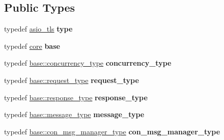 \subsection*{Public Types}
\begin{DoxyCompactItemize}
\item 
\mbox{\label{structwebsocketpp_1_1config_1_1asio__tls_a92b38c443d4d89c2acf4490e696e0810}} 
typedef \mbox{\hyperlink{structwebsocketpp_1_1config_1_1asio__tls}{asio\+\_\+tls}} {\bfseries type}
\item 
\mbox{\label{structwebsocketpp_1_1config_1_1asio__tls_ad3e689ff15338d7bb3647e9af27d4f2f}} 
typedef \mbox{\hyperlink{structwebsocketpp_1_1config_1_1core}{core}} {\bfseries base}
\item 
\mbox{\label{structwebsocketpp_1_1config_1_1asio__tls_a94dbb7a141044dbc99de282fdeb560d8}} 
typedef \mbox{\hyperlink{classwebsocketpp_1_1concurrency_1_1basic}{base\+::concurrency\+\_\+type}} {\bfseries concurrency\+\_\+type}
\item 
\mbox{\label{structwebsocketpp_1_1config_1_1asio__tls_a8435d19caaed4858faa88cae4bc46a81}} 
typedef \mbox{\hyperlink{classwebsocketpp_1_1http_1_1parser_1_1request}{base\+::request\+\_\+type}} {\bfseries request\+\_\+type}
\item 
\mbox{\label{structwebsocketpp_1_1config_1_1asio__tls_ad6c59e6090c5e66d0a9e15f4f6063631}} 
typedef \mbox{\hyperlink{classwebsocketpp_1_1http_1_1parser_1_1response}{base\+::response\+\_\+type}} {\bfseries response\+\_\+type}
\item 
\mbox{\label{structwebsocketpp_1_1config_1_1asio__tls_a27450d727458295e6148c3ed7405e24c}} 
typedef \mbox{\hyperlink{classwebsocketpp_1_1message__buffer_1_1message}{base\+::message\+\_\+type}} {\bfseries message\+\_\+type}
\item 
\mbox{\label{structwebsocketpp_1_1config_1_1asio__tls_add8c7b91ce5f365d76f1d53b37002cc9}} 
typedef \mbox{\hyperlink{classwebsocketpp_1_1message__buffer_1_1alloc_1_1con__msg__manager}{base\+::con\+\_\+msg\+\_\+manager\+\_\+type}} {\bfseries con\+\_\+msg\+\_\+manager\+\_\+type}

\end{DoxyCompactItemize}
